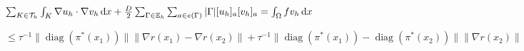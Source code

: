 \documentclass{article}
\begin{document}
$\sum_{K\in\mathcal{T}_{h}}\int_{K}\nabla u_{h}\cdot\nabla v_{h}\,{\rm d}x+\frac{D}{2}\sum_{\Gamma\in\mathbb{E}_{h}}\sum_{a\in e(\Gamma)}|\Gamma|[u_{h}]_{a}[v_{h}]_{a}=\int_{\Omega}fv_{h}\,{\rm d}x$

$\leq\tau^{-1}\|\operatorname{diag}(\pi^{*}(x_{1}))\|\|\nabla r(x_{1})-\nabla r(x_{2})\|+\tau^{-1}\|\operatorname{diag}(\pi^{*}(x_{1}))-\operatorname{diag}(\pi^{*}(x_{2}))\|\|\nabla r(x_{2})\|$
\end{document}
